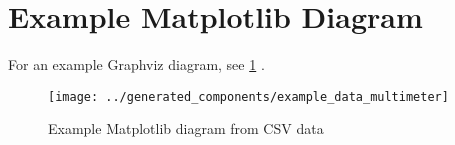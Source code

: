 \section{Example Matplotlib Diagram}

For an example Graphviz diagram, see
\cref{example_matplotlib_plot}%
.

\begin{figure}[h]
    \centering
    \texttt{[image: ../generated\_components/example\_data\_multimeter]}
    \caption{Example Matplotlib diagram from CSV data}
    \label{example_matplotlib_plot}
\end{figure}
